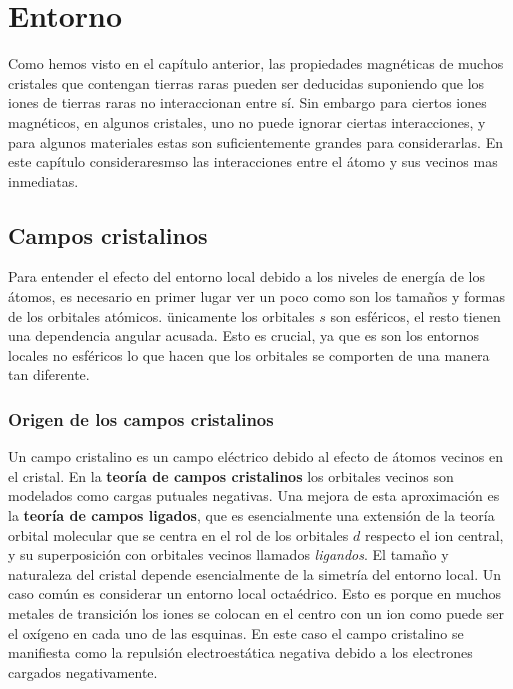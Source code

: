 \documentclass[12pt,a4paper]{book}
\numberwithin{equation}{section}
\numberwithin{figure}{section}
\begin{document}
\newpage

\chapter{Entorno}

Como hemos visto en el capítulo anterior, las propiedades magnéticas de muchos cristales que contengan tierras raras pueden ser deducidas suponiendo que los iones de tierras raras no interaccionan entre sí. Sin embargo para ciertos iones magnéticos, en algunos cristales, uno no puede ignorar ciertas interacciones, y para algunos materiales estas son suficientemente grandes para considerarlas. En este capítulo consideraresmso las interacciones entre el átomo y sus vecinos mas inmediatas. \\

\section{Campos cristalinos}

Para entender el efecto del entorno local debido a los niveles de energía de los átomos, es necesario en primer lugar ver un poco como son los tamaños y formas de los orbitales atómicos. ünicamente los orbitales $s$ son esféricos, el resto tienen una dependencia angular acusada. Esto es crucial, ya que es son los entornos locales no esféricos lo que hacen que los orbitales se comporten de una manera tan diferente.

\subsection{Origen de los campos cristalinos}

Un campo cristalino es un campo eléctrico debido al efecto de átomos vecinos en el cristal. En la \textbf{teoría de campos cristalinos} los orbitales vecinos son modelados como cargas putuales negativas. Una mejora de esta aproximación es la \textbf{teoría de campos ligados}, que es esencialmente una extensión de la teoría orbital molecular que se centra en el rol de los orbitales $d$ respecto el ion central, y su superposición con orbitales vecinos llamados \textit{ligandos}. El tamaño y naturaleza del cristal depende esencialmente de la simetría del entorno local. Un caso común es considerar un entorno local octaédrico. Esto es porque en muchos metales de transición los iones se colocan en el centro con un ion como puede ser el oxígeno en cada uno de las esquinas. En este caso el campo cristalino se manifiesta como la repulsión electroestática negativa debido a los electrones cargados negativamente. \\
\end{document}
